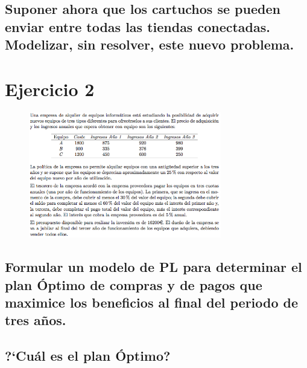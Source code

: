\documentclass[10pt, a4paper]{article}
\begin{document}
		\subsection{Suponer ahora que los cartuchos se pueden enviar entre todas las tiendas conectadas. Modelizar, sin resolver, este nuevo problema.}

			\paragraph{}


    \section{Ejercicio 2}

        \begin{figure}[H]
        \centering
            \includegraphics[width=0.75\textwidth]{res/Exercise_2.png}
        \end{figure}

		\subsection{Formular un modelo de PL para determinar el plan Óptimo de compras y de pagos que maximice los beneficios al final del periodo de tres años.}

			\paragraph{}


		\subsection{?`Cuál es el plan Óptimo?}

			\paragraph{}
\end{document}
